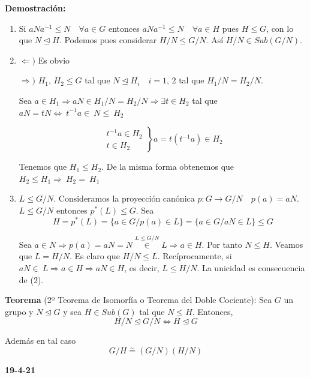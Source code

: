 \documentclass{article}
\begin{document}
\textbf{Demostración:}
\begin{enumerate}[(1)]
\item Si $aNa^{-1}\leq N \quad \forall a\in G$ entonces $aNa^{-1}\leq N \quad \forall a\in H$ pues $H\leq G$, con lo que $N\unlhd H$. Podemos pues considerar $H/N\leq G/N$. Así $H/N\in Sub(G/N)$.

\item $\Leftarrow)$ Es obvio

$\Rightarrow)$ $H_1,\,H_2\leq G$ tal que $N\unlhd H_i\quad i=1,\,2$ tal que $H_1/N=H_2/N$. 

Sea $a\in H_1\Rightarrow aN\in H_1/N=H_2/N\Rightarrow \exists t\in H_2$ tal que $aN=tN\Leftrightarrow~t^{-1}a\in~N\leq~H_2$

\begin{equation*}
\left. \begin{array}{c}
t^{-1}a\in H_2 \\
t\in H_2
\end{array} \right\rbrace a=t(t^{-1}a)\in H_2
\end{equation*}

Tenemos que $H_1\leq H_2$. De la misma forma obtenemos que $H_2\leq H_1 \Rightarrow~H_2=~H_1$

\item $L\leq G/N$. Consideramos la proyección canónica $p:G\rightarrow G/N \quad p(a)=aN$. $L\leq G/N$ entonces $p^*(L)\leq G$. Sea 
\begin{equation*}
H=p^*(L)=\{a\in G/p(a)\in L\}=\{a\in G/aN\in L\}\leq G
\end{equation*}

Sea $a\in N\Rightarrow p(a)=aN=N\overset{L\leq G/N}{\in} L\Rightarrow a\in H$. Por tanto $N\leq H$. Veamos que $L=H/N$. Es claro que $H/N\leq L$. Recíprocamente, si $aN\in~L\Rightarrow a\in H\Rightarrow aN\in H$, es decir, $L\leq H/N$. La unicidad es consecuencia de (2).
\end{enumerate}

\textbf{Teorema} (2º Teorema de Isomorfía o Teorema del Doble Cociente): Sea $G$ un grupo y $N\unlhd G$ y sea $H\in Sub(G)$ tal que $N\leq H$. Entonces,
\begin{equation*}
H/N\unlhd G/N\Leftrightarrow H\unlhd G
\end{equation*}

Además en tal caso
\begin{equation*}
G/H\overset{\sim}{=}(G/N)(H/N)
\end{equation*}

\textbf{19-4-21} \\
\end{document}
